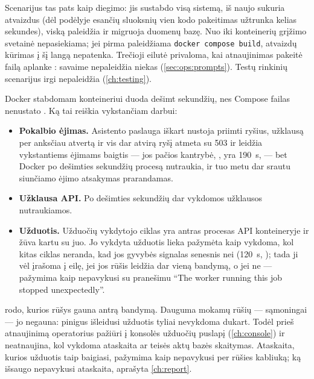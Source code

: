 Scenarijus tas pats kaip diegimo: jis sustabdo visą sistemą, iš naujo sukuria atvaizdus (dėl
podėlyje esančių sluoksnių vien kodo pakeitimas užtrunka kelias sekundes), viską paleidžia ir
migruoja duomenų bazę. Nuo  iki konteinerių grįžimo svetainė nepasiekiama; jei pirma
paleidžiama \texttt{docker compose build}, atvaizdų kūrimas į šį langą nepatenka. Trečioji eilutė
privaloma, kai atnaujinimas pakeitė failą aplanke
:  savaime nepaleidžia niekas
(\cref{sec:ops:prompts}). Testų rinkinių scenarijus irgi nepaleidžia (\cref{ch:testing}).

Docker stabdomam konteineriui duoda dešimt sekundžių, nes Compose failas nenustato
. Ką tai reiškia vykstančiam darbui:

\begin{itemize}
  \item \textbf{Pokalbio ėjimas.} Asistento paslauga iškart nustoja priimti ryšius, užklausą per
    anksčiau atvertą ir vis dar atvirą ryšį atmeta su 503  ir leidžia
    vykstantiems ėjimams baigtis --- jos pačios kantrybė, , yra 190~s,
    --- bet Docker po dešimties sekundžių procesą nutraukia, ir tuo metu dar srautu siunčiamo
    ėjimo atsakymas prarandamas.
  \item \textbf{Užklausa API.} Po dešimties sekundžių dar vykdomos užklausos nutraukiamos.
  \item \textbf{Užduotis.} Užduočių vykdytojo ciklas yra antras procesas API konteineryje ir
    žūva kartu su juo. Jo vykdyta užduotis lieka pažymėta kaip vykdoma, kol kitas ciklas
    neranda, kad jos gyvybės signalas senesnis nei  (120~s, );
    tada ji vėl įrašoma į eilę, jei jos rūšis leidžia dar vieną bandymą, o jei ne --- pažymima
    kaip nepavykusi su pranešimu \enquote{The worker running this job stopped unexpectedly}.
\end{itemize}

 rodo, kurios rūšys gauna antrą bandymą. Dauguma mokamų rūšių --- sąmoningai
--- jo negauna: pinigus išleidusi užduotis tyliai nevykdoma dukart. Todėl prieš atnaujinimą
operatorius pažiūri į konsolės užduočių puslapį (\cref{ch:console}) ir neatnaujina, kol vykdoma
ataskaita ar teisės aktų bazės skaitymas. Ataskaita, kurios užduotis taip baigiasi, pažymima kaip
nepavykusi per rūšies  kabliuką; ką išsaugo nepavykusi ataskaita, aprašyta
\cref{ch:report}.

